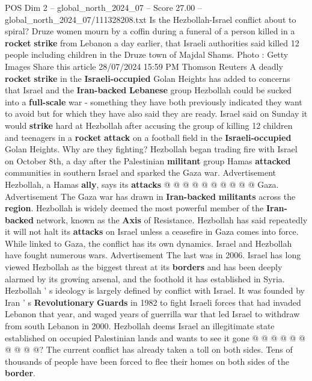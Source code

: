 \begin{textsample}{POS Dim 2 – global\_north\_2024\_07 – Score 27.00 – global\_north\_2024\_07/111328208.txt}  \label{ex:f2_pos_182}
Is the Hezbollah-Israel conflict about to spiral?
Druze women mourn by a coffin during a funeral of a person killed in a \textbf{rocket} \textbf{strike} from Lebanon a day earlier, that Israeli authorities said killed 12 people including children in the Druze town of Majdal Shams.
Photo : Getty Images Share this article 28/07/2024 15:59 PM Thomson Reuters A deadly \textbf{rocket} \textbf{strike} in the \textbf{Israeli-occupied} Golan Heights has added to concerns that Israel and the \textbf{Iran-backed} \textbf{Lebanese} group Hezbollah could be sucked into a \textbf{full-scale} war - something they have both previously indicated they want to avoid but for which they have also said they are ready.
Israel said on Sunday it would \textbf{strike} hard at Hezbollah after accusing the group of killing 12 children and teenagers in a \textbf{rocket} \textbf{attack} on a football field in the \textbf{Israeli-occupied} Golan Heights.
Why are they fighting?
Hezbollah began trading fire with Israel on October 8th, a day after the Palestinian \textbf{militant} group Hamas \textbf{attacked} communities in southern Israel and sparked the Gaza war.
Advertisement Hezbollah, a Hamas \textbf{ally}, says its \textbf{attacks} @ @ @ @ @ @ @ @ @ @ Gaza.
Advertisement The Gaza war has drawn in \textbf{Iran-backed} \textbf{militants} across the \textbf{region}.
Hezbollah is widely deemed the most powerful member of the \textbf{Iran-backed} network, known as the \textbf{Axis} of Resistance.
Hezbollah has said repeatedly it will not halt its \textbf{attacks} on Israel unless a ceasefire in Gaza comes into force.
While linked to Gaza, the conflict has its own dynamics.
Israel and Hezbollah have fought numerous wars.
Advertisement The last was in 2006.
Israel has long viewed Hezbollah as the biggest threat at its \textbf{borders} and has been deeply alarmed by its growing arsenal, and the foothold it has established in Syria.
Hezbollah ' s ideology is largely defined by conflict with Israel.
It was founded by Iran ' s \textbf{Revolutionary} \textbf{Guards} in 1982 to fight Israeli forces that had invaded Lebanon that year, and waged years of guerrilla war that led Israel to withdraw from south Lebanon in 2000.
Hezbollah deems Israel an illegitimate state established on occupied Palestinian lands and wants to see it gone @ @ @ @ @ @ @ @ @ @?
The current conflict has already taken a toll on both sides.
Tens of thousands of people have been forced to flee their homes on both sides of the \textbf{border}.

\end{textsample}
